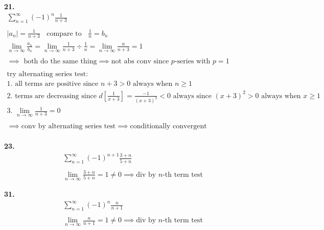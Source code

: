 \documentclass{article}
\begin{document}
\noindent
\textbf{21.}
\begin{gather*}
\sum_{n=1}^{\infty} (-1)^n \frac{1}{n+3}
\\
\\
|a_n|=\frac{1}{n+3}
~~~~\text{compare to}~~~~
\frac{1}{n}=b_n
\\
\lim_{n \to \infty} \frac{a_n}{b_n} = \lim_{n \to \infty} \frac{1}{n+3} \div \frac{1}{n}
= \lim_{n \to \infty} \frac{n}{n+3}=1
\\
\\
\implies \text{~both do the same thing}
\implies \text{not abs conv since $p$-series with $p=1$}
\\
\\
\text{try alternating series test:}
\\
\text{1. all terms are positive since } n+3 > 0 \text{~always when } n \geq 1
\\
\text{2. terms are decreasing since }
d \left[ \frac{1}{x+3} \right]
=\frac{-1}{(x+3)^2} < 0
\text{~always since } (x+3)^2>0 \text{~always when } x \geq 1
\\
\text{3. }
\lim_{n \to \infty} \frac{1}{n+3}=0
\\
\\
\implies
\text{conv by alternating series test}
\implies\text{conditionally convergent}
\end{gather*}
\hfill
\\



\noindent
\textbf{23.}
\begin{gather*}
\sum_{n=1}^{\infty} (-1)^{n+1} \frac{3+n}{5+n}
\\
\\
\lim_{n \to \infty} \frac{3+n}{5+n}=1 \neq 0 \implies \text{div by $n$-th term test}
\end{gather*}


\noindent
\textbf{31.}
\begin{gather*}
\sum_{n=1}^{\infty} (-1)^n \frac{n}{n+1}
\\
\\
\lim_{n \to \infty} \frac{n}{n+1}=1 \neq 0 \implies \text{div by $n$-th term test}
\end{gather*}
\end{document}
